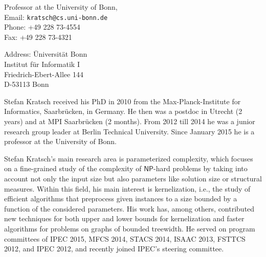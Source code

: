 \documentclass[a4paper,10pt]{article}
\newcommand{\NP}{\ensuremath{\mathsf{NP}}\xspace}
\begin{document}
\begin{multicols}{2}
\noindent Professor at the University of Bonn, \\
Email: \texttt{kratsch@cs.uni-bonn.de} \\
Phone: +49 228 73-4554\\
Fax: +49 228 73-4321
\begin{tabbing}
Address: \= Universit\"at Bonn\\
\> Institut f\"ur Informatik I\\
\> Friedrich-Ebert-Allee 144\\
\> D-53113 Bonn
\end{tabbing}
\end{multicols}

Stefan Kratsch received his PhD in 2010 from the Max-Planck-Institute for Informatics, Saarbr\"ucken, in Germany. He then was a postdoc in Utrecht (2 years) and at MPI Saarbr\"ucken (2 months). From 2012 till 2014 he was a junior research group leader at Berlin Technical University. Since January 2015 he is a professor at the University of Bonn.

Stefan Kratsch's main research area is parameterized complexity, which focuses on a fine-grained study of the complexity of \NP-hard problems by taking into account not only the input size but also parameters like solution size or structural measures. Within this field, his main interest is kernelization, i.e., the study of efficient algorithms that preprocess given instances to a size bounded by a function of the considered parameters. His work has, among others, contributed new techniques for both upper and lower bounds for kernelization and faster algorithms for problems on graphs of bounded treewidth. He served on program committees of IPEC 2015, MFCS 2014, STACS 2014, ISAAC 2013, FSTTCS 2012, and IPEC 2012, and recently joined IPEC's steering committee.
\end{document}
